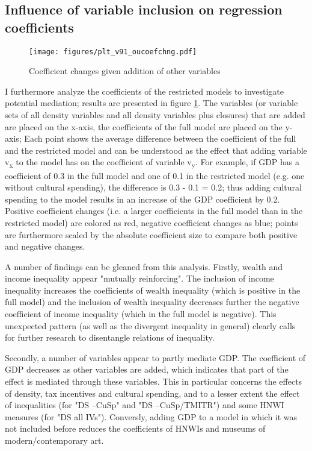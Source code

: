 \documentclass[11pt]{article}
\begin{document}
\subsection{Influence of variable inclusion on regression coefficients}
\label{app_mediation}
\begin{landscape}

\begin{figure}[htbp]
\centering
\texttt{[image: figures/plt\_v91\_oucoefchng.pdf]}
\caption{\label{fig:oucoefchng}Coefficient changes given addition of other variables}
\end{figure}

\end{landscape}

I furthermore analyze the coefficients of the restricted models to investigate potential mediation; results are presented in figure \ref{fig:oucoefchng}.
The variables (or variable sets of all density variables and all density variables plus closures) that are added are placed on the x-axis, the coefficients of the full model are placed on the y-axis;
Each point shows the average difference between the coefficient of the full and the restricted model and can be understood as the effect that adding variable v\textsubscript{x} to the model has on the coefficient of variable v\textsubscript{y}.
For example, if GDP has a coefficient of 0.3 in the full model and one of 0.1 in the restricted model (e.g. one without cultural spending), the difference is 0.3 - 0.1 = 0.2; thus adding cultural spending to the model results in an increase of the GDP coefficient by 0.2. 
Positive coefficient changes (i.e. a larger coefficients in the full model than in the restricted model) are colored as red, negative coefficient changes as blue; points are furthermore scaled by the absolute coefficient size to compare both positive and negative changes. 


A number of findings can be gleaned from this analysis.
Firstly, wealth and income inequality appear "mutually reinforcing".
The inclusion of income inequality increases the coefficients of wealth inequality (which is positive in the full model) and the inclusion of wealth inequality decreases further the negative coefficient of income inequality (which in the full model is negative).
This unexpected pattern (as well as the divergent inequality in general) clearly calls for further research to disentangle relations of inequality.


Secondly, a number of variables appear to partly mediate GDP.
The coefficient of GDP decreases as other variables are added, which indicates that part of the effect is mediated through these variables.
This in particular concerns the effects of density, tax incentives and cultural spending, and to a lesser extent the effect of inequalities (for "DS --CuSp" and "DS --CuSp/TMITR") and some HNWI measures (for "DS all IVs").
Conversly, adding GDP to a model in which it was not included before reduces the coefficients of HNWIs and museums of modern/contemporary art.
\end{document}
